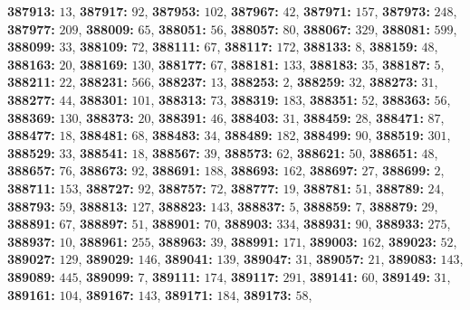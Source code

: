 \textsf{\bfseries 387913:} $13$, \textsf{\bfseries 387917:} $92$, \textsf{\bfseries 387953:} $102$, \textsf{\bfseries 387967:} $42$, \textsf{\bfseries 387971:} $157$, \textsf{\bfseries 387973:} $248$, \textsf{\bfseries 387977:} $209$, \textsf{\bfseries 388009:} $65$, \textsf{\bfseries 388051:} $56$, \textsf{\bfseries 388057:} $80$, \textsf{\bfseries 388067:} $329$, \textsf{\bfseries 388081:} $599$, \textsf{\bfseries 388099:} $33$, \textsf{\bfseries 388109:} $72$, \textsf{\bfseries 388111:} $67$, \textsf{\bfseries 388117:} $172$, \textsf{\bfseries 388133:} $8$, \textsf{\bfseries 388159:} $48$, \textsf{\bfseries 388163:} $20$, \textsf{\bfseries 388169:} $130$, \textsf{\bfseries 388177:} $67$, \textsf{\bfseries 388181:} $133$, \textsf{\bfseries 388183:} $35$, \textsf{\bfseries 388187:} $5$, \textsf{\bfseries 388211:} $22$, \textsf{\bfseries 388231:} $566$, \textsf{\bfseries 388237:} $13$, \textsf{\bfseries 388253:} $2$, \textsf{\bfseries 388259:} $32$, \textsf{\bfseries 388273:} $31$, \textsf{\bfseries 388277:} $44$, \textsf{\bfseries 388301:} $101$, \textsf{\bfseries 388313:} $73$, \textsf{\bfseries 388319:} $183$, \textsf{\bfseries 388351:} $52$, \textsf{\bfseries 388363:} $56$, \textsf{\bfseries 388369:} $130$, \textsf{\bfseries 388373:} $20$, \textsf{\bfseries 388391:} $46$, \textsf{\bfseries 388403:} $31$, \textsf{\bfseries 388459:} $28$, \textsf{\bfseries 388471:} $87$, \textsf{\bfseries 388477:} $18$, \textsf{\bfseries 388481:} $68$, \textsf{\bfseries 388483:} $34$, \textsf{\bfseries 388489:} $182$, \textsf{\bfseries 388499:} $90$, \textsf{\bfseries 388519:} $301$, \textsf{\bfseries 388529:} $33$, \textsf{\bfseries 388541:} $18$, \textsf{\bfseries 388567:} $39$, \textsf{\bfseries 388573:} $62$, \textsf{\bfseries 388621:} $50$, \textsf{\bfseries 388651:} $48$, \textsf{\bfseries 388657:} $76$, \textsf{\bfseries 388673:} $92$, \textsf{\bfseries 388691:} $188$, \textsf{\bfseries 388693:} $162$, \textsf{\bfseries 388697:} $27$, \textsf{\bfseries 388699:} $2$, \textsf{\bfseries 388711:} $153$, \textsf{\bfseries 388727:} $92$, \textsf{\bfseries 388757:} $72$, \textsf{\bfseries 388777:} $19$, \textsf{\bfseries 388781:} $51$, \textsf{\bfseries 388789:} $24$, \textsf{\bfseries 388793:} $59$, \textsf{\bfseries 388813:} $127$, \textsf{\bfseries 388823:} $143$, \textsf{\bfseries 388837:} $5$, \textsf{\bfseries 388859:} $7$, \textsf{\bfseries 388879:} $29$, \textsf{\bfseries 388891:} $67$, \textsf{\bfseries 388897:} $51$, \textsf{\bfseries 388901:} $70$, \textsf{\bfseries 388903:} $334$, \textsf{\bfseries 388931:} $90$, \textsf{\bfseries 388933:} $275$, \textsf{\bfseries 388937:} $10$, \textsf{\bfseries 388961:} $255$, \textsf{\bfseries 388963:} $39$, \textsf{\bfseries 388991:} $171$, \textsf{\bfseries 389003:} $162$, \textsf{\bfseries 389023:} $52$, \textsf{\bfseries 389027:} $129$, \textsf{\bfseries 389029:} $146$, \textsf{\bfseries 389041:} $139$, \textsf{\bfseries 389047:} $31$, \textsf{\bfseries 389057:} $21$, \textsf{\bfseries 389083:} $143$, \textsf{\bfseries 389089:} $445$, \textsf{\bfseries 389099:} $7$, \textsf{\bfseries 389111:} $174$, \textsf{\bfseries 389117:} $291$, \textsf{\bfseries 389141:} $60$, \textsf{\bfseries 389149:} $31$, \textsf{\bfseries 389161:} $104$, \textsf{\bfseries 389167:} $143$, \textsf{\bfseries 389171:} $184$, \textsf{\bfseries 389173:} $58$, 
